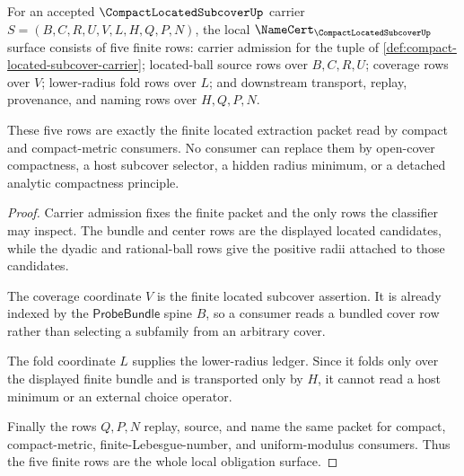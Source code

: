 \begin{theorem}
\label{thm:compact-located-subcover-namecert-obligations}
For an accepted $\CompactLocatedSubcoverUp$ carrier $S=(B,C,R,U,V,L,H,Q,P,N)$, the local $\NameCert_{\CompactLocatedSubcoverUp}$ surface consists of five finite rows: carrier admission for the tuple of \autoref{def:compact-located-subcover-carrier}; located-ball source rows over $B,C,R,U$; coverage rows over $V$; lower-radius fold rows over $L$; and downstream transport, replay, provenance, and naming rows over $H,Q,P,N$.

These five rows are exactly the finite located extraction packet read by compact and compact-metric consumers. No consumer can replace them by open-cover compactness, a host subcover selector, a hidden radius minimum, or a detached analytic compactness principle.
\end{theorem}
\begin{proof}
Carrier admission fixes the finite packet and the only rows the classifier may inspect. The bundle and center rows are the displayed located candidates, while the dyadic and rational-ball rows give the positive radii attached to those candidates.

The coverage coordinate $V$ is the finite located subcover assertion. It is already indexed by the $\mathsf{ProbeBundle}$ spine $B$, so a consumer reads a bundled cover row rather than selecting a subfamily from an arbitrary cover.

The fold coordinate $L$ supplies the lower-radius ledger. Since it folds only over the displayed finite bundle and is transported only by $H$, it cannot read a host minimum or an external choice operator.

Finally the rows $Q,P,N$ replay, source, and name the same packet for compact, compact-metric, finite-Lebesgue-number, and uniform-modulus consumers. Thus the five finite rows are the whole local obligation surface.
\end{proof}

